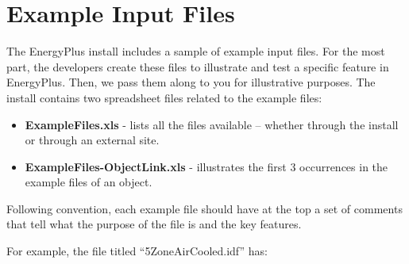 \chapter{Example Input Files}\label{example-input-files}

The EnergyPlus install includes a sample of example input files. For the most part, the developers create these files to illustrate and test a specific feature in EnergyPlus. Then, we pass them along to you for illustrative purposes. The install contains two spreadsheet files related to the example files:

\begin{itemize}
\item
  \textbf{ExampleFiles.xls} - lists all the files available -- whether through the install or through an external site.
\item
  \textbf{ExampleFiles-ObjectLink.xls} - illustrates the first 3 occurrences in the example files of an object.
\end{itemize}

Following convention, each example file should have at the top a set of comments that tell what the purpose of the file is and the key features.

For example, the file titled ``5ZoneAirCooled.idf'' has:

